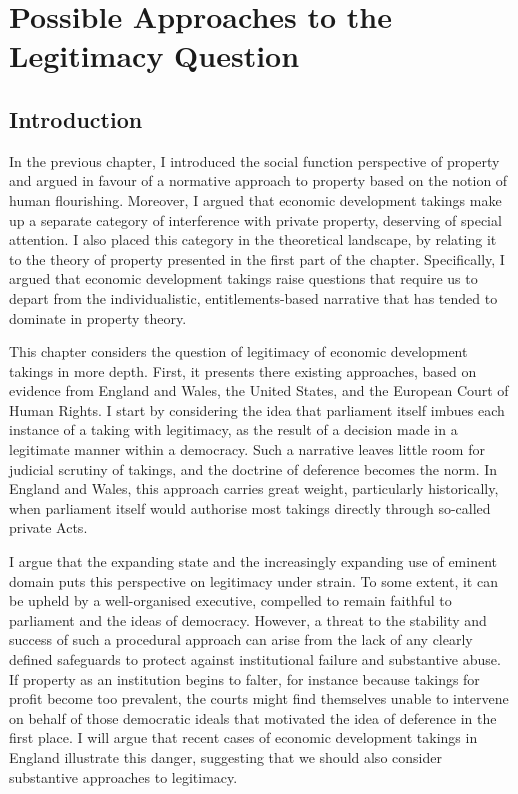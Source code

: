 
\chapter{Possible Approaches to the Legitimacy Question}\label{chap:3}

\section{Introduction}\label{sec:3:1}

In the previous chapter, I introduced the social function perspective of property and argued in favour of a normative approach to property based on the notion of human flourishing. Moreover, I argued that economic development takings make up a separate category of interference with private property, deserving of special attention. I also placed this category in the theoretical landscape, by relating it to the theory of property presented in the first part of the chapter. Specifically, I argued that economic development takings raise questions that require us to depart from the individualistic, entitlements-based narrative that has tended to dominate in property theory.

This chapter considers the question of legitimacy of economic development takings in more depth. First, it presents there existing approaches, based on evidence from England and Wales, the United States, and the European Court of Human Rights. I start by considering the idea that parliament itself imbues each instance of a taking with legitimacy, as the result of a decision made in a legitimate manner within a democracy. Such a narrative leaves little room for judicial scrutiny of takings, and the doctrine of deference becomes the norm. In England and Wales, this approach carries great weight, particularly historically, when parliament itself would authorise most takings directly through so-called private Acts. 

I argue that the expanding state and the increasingly expanding use of eminent domain puts this perspective on legitimacy under strain. To some extent, it can be upheld by a well-organised executive, compelled to remain faithful to parliament and the ideas of democracy. However, a threat to the stability and success of such a procedural approach can arise from the lack of any clearly defined safeguards to protect against institutional failure and substantive abuse. If property as an institution begins to falter, for instance because takings for profit become too prevalent, the courts might find themselves unable to intervene on behalf of those democratic ideals that motivated the idea of deference in the first place. I will argue that recent cases of economic development takings in England illustrate this danger, suggesting that we should also consider substantive approaches to legitimacy.

